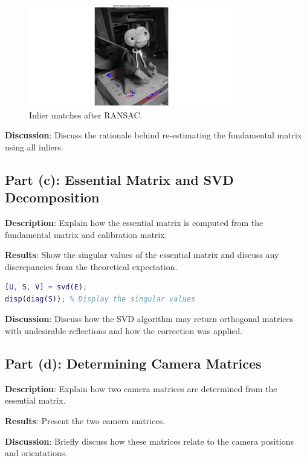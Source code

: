 \documentclass{article}
\begin{document}
\begin{figure}[h!]
    \centering
    \includegraphics[trim={15cm 0 15cm 0}, clip, width=0.8\textwidth]{Figure_3.png}
    \caption{Inlier matches after RANSAC.}
\end{figure}

\textbf{Discussion}: Discuss the rationale behind re-estimating the fundamental matrix using all inliers.

\subsection{Part (c): Essential Matrix and SVD Decomposition}
\textbf{Description}: Explain how the essential matrix is computed from the fundamental matrix and calibration matrix.

\textbf{Results}: Show the singular values of the essential matrix and discuss any discrepancies from the theoretical expectation.

\begin{lstlisting}[language=Matlab, caption={SVD Calculation of the Essential Matrix}, label={lst:svd}]
% Example code for SVD decomposition
[U, S, V] = svd(E);
disp(diag(S)); % Display the singular values
\end{lstlisting}

\textbf{Discussion}: Discuss how the SVD algorithm may return orthogonal matrices with undesirable reflections and how the correction was applied.

\subsection{Part (d): Determining Camera Matrices}
\textbf{Description}: Explain how two camera matrices are determined from the essential matrix.

\textbf{Results}: Present the two camera matrices.

\textbf{Discussion}: Briefly discuss how these matrices relate to the camera positions and orientations.
\end{document}
